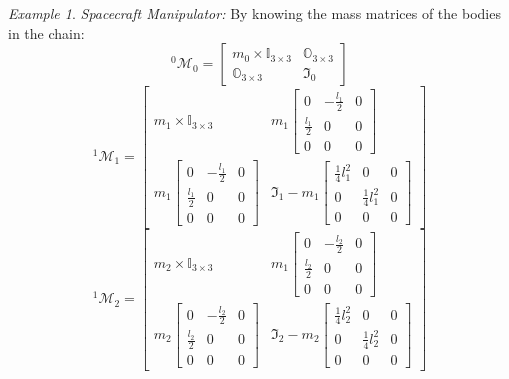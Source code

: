 \documentclass[lettersize,journal]{IEEEtran}
\def \m  {\mathfrak{m}}
\theoremstyle{remark}
\newtheorem{example}{Example}[subsection]
\begin{document}
\begin{example}{ \textit{Spacecraft Manipulator:}}
By knowing the mass matrices of the bodies in the chain:
\begin{equation*}
    ^0\mathcal{M}_0=\begin{bmatrix}m_0\times \mathbb{I}_{3\times3} & \mathbb{O}_{3\times3}\\\mathbb{O}_{3\times3} & \mathfrak{I}_0\end{bmatrix}
\end{equation*}
\begin{equation*}
    ^1\mathcal{M}_1=\begin{bmatrix} m_1\times \mathbb{I}_{3\times3} & m_1\begin{bmatrix}
    0 & -\frac{l_1}{2} & 0\\\frac{l_1}{2} & 0 & 0\\0 & 0 & 0\end{bmatrix}\\m_1\begin{bmatrix}
    0 & -\frac{l_1}{2} & 0\\\frac{l_1}{2} & 0 & 0\\0 & 0 & 0\end{bmatrix} & \mathfrak{I}_1-m_1\begin{bmatrix}
    \frac{1}{4}l_1^2 & 0 & 0\\0 & \frac{1}{4}l_1^2 & 0\\0 & 0 & 0\end{bmatrix}\end{bmatrix}
\end{equation*}
\begin{equation*}
    ^1\mathcal{M}_2=\begin{bmatrix} m_2\times \mathbb{I}_{3\times3} & m_1\begin{bmatrix}
    0 & -\frac{l_2}{2} & 0\\\frac{l_2}{2} & 0 & 0\\0 & 0 & 0\end{bmatrix}\\m_2\begin{bmatrix}
    0 & -\frac{l_2}{2} & 0\\\frac{l_2}{2} & 0 & 0\\0 & 0 & 0\end{bmatrix} & \mathfrak{I}_2-m_2\begin{bmatrix}
    \frac{1}{4}l_2^2 & 0 & 0\\0 & \frac{1}{4}l_2^2 & 0\\0 & 0 & 0\end{bmatrix}\end{bmatrix}
\end{equation*}


\end{example}
\end{document}
